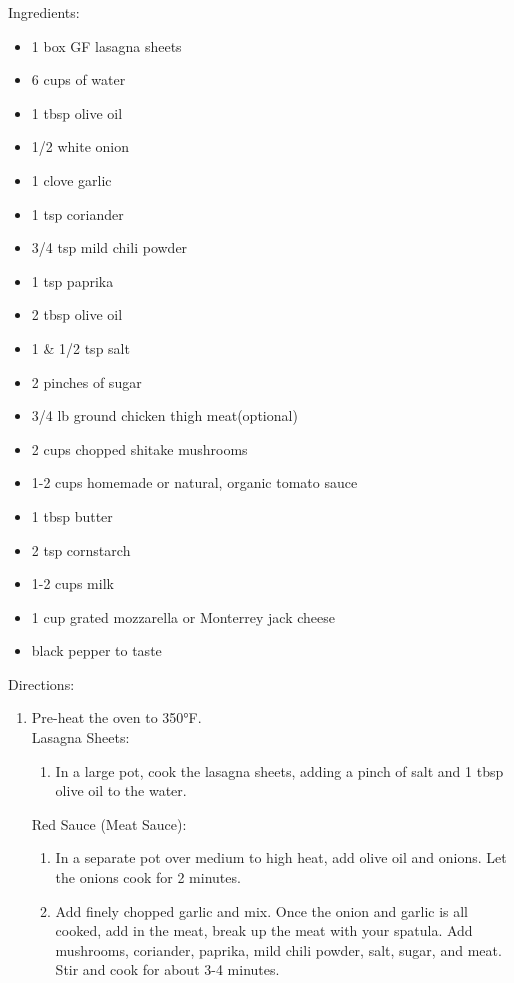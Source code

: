 \documentclass{article}
\begin{document}
%
%
%
%
%

\begin{multicols}{2}
Ingredients:
\begin{itemize}
\item 1 box GF lasagna sheets
\item 6 cups of water
\item 1 tbsp olive oil
\item 1/2 white onion
\item 1 clove garlic
\item 1 tsp coriander
\item 3/4 tsp mild chili powder
\item 1 tsp paprika
\item 2 tbsp olive oil
\item 1 \& 1/2 tsp salt
\item 2 pinches of sugar
\item 3/4 lb ground chicken thigh meat(optional)
\item 2 cups chopped shitake mushrooms
\item 1-2 cups homemade or natural, organic tomato sauce
\item 1 tbsp butter
\item 2 tsp cornstarch
\item 1-2 cups milk
\item 1 cup grated mozzarella or Monterrey jack cheese
\item black pepper to taste
\end{itemize}

\columnbreak

Directions:
\begin{enumerate}
\item Pre-heat the oven to 350°F.\\

Lasagna Sheets:
\begin{enumerate}
\item In a large pot, cook the lasagna sheets, adding a pinch of salt and 1 tbsp olive oil to the water.
\end{enumerate}

Red Sauce (Meat Sauce):
\begin{enumerate}
\item In a separate pot over medium to high heat, add olive oil and onions. Let the onions cook for 2 minutes.

\item Add finely chopped garlic and mix. Once the onion and garlic is all cooked, add in the meat, break up the meat with your spatula. Add mushrooms, coriander, paprika, mild chili powder, salt, sugar, and meat. Stir and cook for about 3-4 minutes.


\end{enumerate}
\end{enumerate}
\end{multicols}
\end{document}
